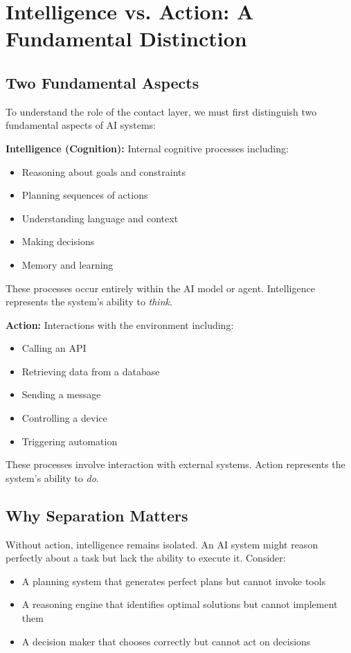 \section{Intelligence vs. Action: A Fundamental Distinction}

\subsection{Two Fundamental Aspects}
To understand the role of the contact layer, we must first distinguish two fundamental aspects of AI systems:

\textbf{Intelligence (Cognition):} Internal cognitive processes including:
\begin{itemize}[leftmargin=*]
\item Reasoning about goals and constraints
\item Planning sequences of actions
\item Understanding language and context
\item Making decisions
\item Memory and learning
\end{itemize}

These processes occur entirely within the AI model or agent. Intelligence represents the system's ability to \textit{think}.

\textbf{Action:} Interactions with the environment including:
\begin{itemize}[leftmargin=*]
\item Calling an API
\item Retrieving data from a database
\item Sending a message
\item Controlling a device
\item Triggering automation
\end{itemize}

These processes involve interaction with external systems. Action represents the system's ability to \textit{do}.

\subsection{Why Separation Matters}
Without action, intelligence remains isolated. An AI system might reason perfectly about a task but lack the ability to execute it. Consider:
\begin{itemize}[leftmargin=*]
\item A planning system that generates perfect plans but cannot invoke tools
\item A reasoning engine that identifies optimal solutions but cannot implement them
\item A decision maker that chooses correctly but cannot act on decisions
\end{itemize}

